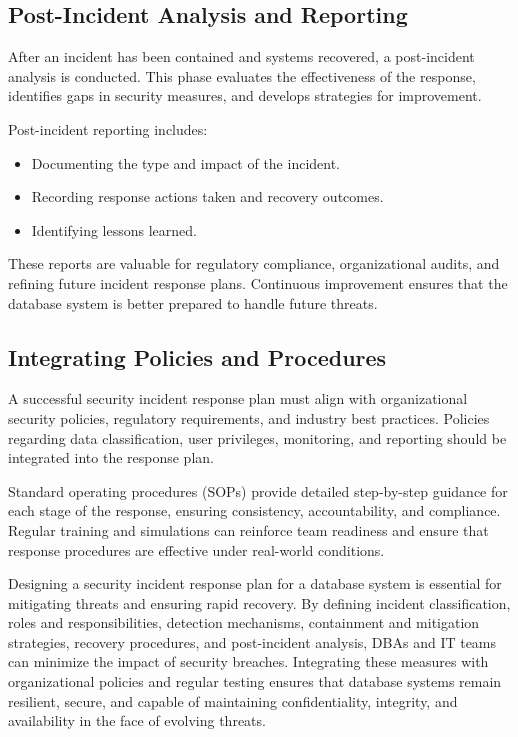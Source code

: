 \documentclass[12pt,a4paper]{article}
\begin{document}
\subsection{Post-Incident Analysis and Reporting}

After an incident has been contained and systems recovered, a post-incident analysis is conducted. This phase evaluates the effectiveness of the response, identifies gaps in security measures, and develops strategies for improvement.

Post-incident reporting includes:
\begin{itemize}
  \item Documenting the type and impact of the incident.
  \item Recording response actions taken and recovery outcomes.
  \item Identifying lessons learned.
\end{itemize}

These reports are valuable for regulatory compliance, organizational audits, and refining future incident response plans. Continuous improvement ensures that the database system is better prepared to handle future threats.

\subsection{Integrating Policies and Procedures}

A successful security incident response plan must align with organizational security policies, regulatory requirements, and industry best practices. Policies regarding data classification, user privileges, monitoring, and reporting should be integrated into the response plan.

Standard operating procedures (SOPs) provide detailed step-by-step guidance for each stage of the response, ensuring consistency, accountability, and compliance. Regular training and simulations can reinforce team readiness and ensure that response procedures are effective under real-world conditions.

\begin{conclusion}
Designing a security incident response plan for a database system is essential for mitigating threats and ensuring rapid recovery. By defining incident classification, roles and responsibilities, detection mechanisms, containment and mitigation strategies, recovery procedures, and post-incident analysis, DBAs and IT teams can minimize the impact of security breaches. Integrating these measures with organizational policies and regular testing ensures that database systems remain resilient, secure, and capable of maintaining confidentiality, integrity, and availability in the face of evolving threats.
\end{conclusion}
\end{document}
